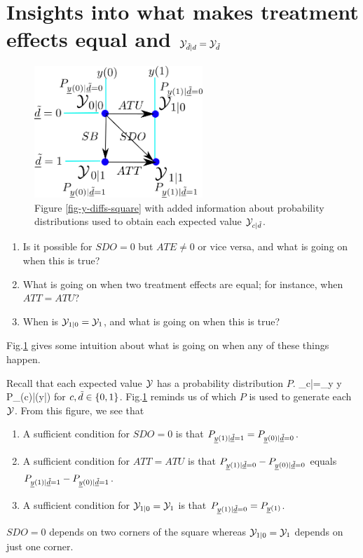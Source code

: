 \section{Insights into 
what makes treatment effects equal and 
${\cal Y}_{\tilde{d}|d}={\cal Y}_{\tilde{d}}$}
\label{sec-td-ignored}

\begin{figure}[h!]
\centering
\includegraphics[width=2.5in]
{pot-out/y-diffs-square-probs.png}
\caption{Figure \ref{fig-y-diffs-square} 
with added information
about  probability distributions 
used to obtain each expected value
 ${\cal Y}_{c|{\tilde{d}} }$.}
\label{fig-y-diffs-square-probs}
\end{figure}


\begin{enumerate}
\item 
Is it
possible for $SDO=0$ but $ATE\neq 0$
or vice versa, and
what is going on when this is true?
\item
What is going on when two treatment effects
are equal; for instance, when $ATT=ATU$?
\item
When is ${\cal Y}_{1|0}={\cal Y}_{1}$,
and what is going on when this is  true?
\end{enumerate}
Fig.\ref{fig-y-diffs-square-probs}
gives some 
intuition 
about what is
going on when any of these 
things happen.

Recall that
each expected value ${\cal Y}$ has a probability
distribution $P$.
\beq
\caly_{c|\td }=\sum_{y} y P_{\rvy(c)|\rvtd}(y|\td)
\eeq
for $c, {\tilde{d}}\in \{0,1\}$.
Fig.\ref{fig-y-diffs-square-probs}
reminds us of which $P$
is used to generate each ${\cal Y}$.
From this figure, we see that

\begin{enumerate}
\item
A sufficient
condition for $SDO=0$
is that 
$P_{{\underline{y}}(1)|{\underline{\tilde{d}}}=1}
=
P_{{\underline{y}}(0)|{\underline{\tilde{d}}}=0}$.

\item
A sufficient condition for
$ATT=ATU$
is that 
$P_{{\underline{y}}(1)|{\underline{\tilde{d}}}=0}
-
P_{{\underline{y}}(0)|{\underline{\tilde{d}}}=0}$
equals
$P_{{\underline{y}}(1)|{\underline{\tilde{d}}}=1}
-
P_{{\underline{y}}(0)|{\underline{\tilde{d}}}=1}$.
\item
A sufficient condition for ${\cal Y}_{1|0}={\cal Y}_{1}$
is that
$P_{{\underline{y}}(1)|{\underline{\tilde{d}}}=0}=
P_{{\underline{y}}(1)}$.
\end{enumerate}
$SDO=0$
depends on two corners
of the square
whereas  ${\cal Y}_{1|0}={\cal Y}_{1}$
depends on just one corner.


